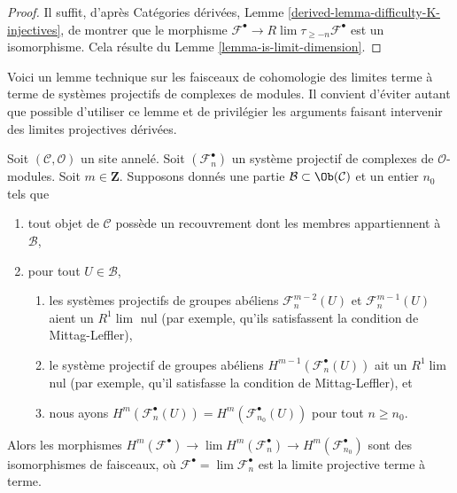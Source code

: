 \begin{proof}
Il suffit, d'après Catégories dérivées, Lemme
\ref{derived-lemma-difficulty-K-injectives}, de montrer que le morphisme
$\mathcal{F}^\bullet \to R\lim \tau_{\geq -n} \mathcal{F}^\bullet$
est un isomorphisme. Cela résulte du Lemme
\ref{lemma-is-limit-dimension}.
\end{proof}

\noindent
Voici un lemme technique sur les faisceaux de cohomologie des limites terme
à terme de systèmes projectifs de complexes de modules. Il convient
d'éviter autant que possible d'utiliser ce lemme et de privilégier les
arguments faisant intervenir des limites projectives dérivées.

\begin{lemma}
\label{lemma-inverse-limit-complexes}
Soit $(\mathcal{C}, \mathcal{O})$ un site annelé. Soit
$(\mathcal{F}_n^\bullet)$ un système projectif de complexes de
$\mathcal{O}$-modules. Soit $m \in \mathbf{Z}$. Supposons donnés une partie
$\mathcal{B} \subset \Ob(\mathcal{C})$ et un entier $n_0$ tels que
\begin{enumerate}
\item tout objet de $\mathcal{C}$ possède un recouvrement dont les membres
appartiennent à $\mathcal{B}$,
\item pour tout $U \in \mathcal{B}$,
\begin{enumerate}
\item les systèmes projectifs de groupes abéliens
$\mathcal{F}_n^{m - 2}(U)$ et $\mathcal{F}_n^{m - 1}(U)$
aient un $R^1\lim$ nul (par exemple, qu'ils satisfassent la condition de
Mittag-Leffler),
\item le système projectif de groupes abéliens
$H^{m - 1}(\mathcal{F}_n^\bullet(U))$ ait un $R^1\lim$ nul (par exemple,
qu'il satisfasse la condition de Mittag-Leffler), et
\item nous ayons
$H^m(\mathcal{F}_n^\bullet(U)) = H^m(\mathcal{F}_{n_0}^\bullet(U))$
pour tout $n \geq n_0$.
\end{enumerate}
\end{enumerate}
Alors les morphismes
$H^m(\mathcal{F}^\bullet) \to \lim H^m(\mathcal{F}_n^\bullet)
\to H^m(\mathcal{F}_{n_0}^\bullet)$ sont des isomorphismes de faisceaux,
où $\mathcal{F}^\bullet = \lim \mathcal{F}_n^\bullet$ est la limite
projective terme à terme.
\end{lemma}

